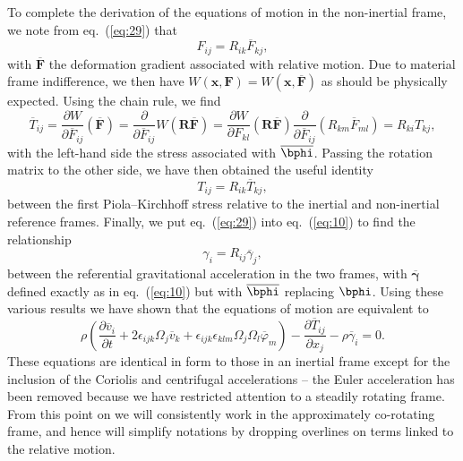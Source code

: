 To complete the derivation of the equations of motion in the non-inertial frame, we note from eq.~(\ref{eq:29}) that
\begin{equation}
F_{ij}=R_{ik}\overline{F}_{kj},
\label{eq:36}
\end{equation}
with $\overline{\mathbf{F}}$ the deformation gradient associated with relative motion. Due to material frame 
indifference, we then have $W(\mathbf{x},\mathbf{F})=W(\mathbf{x},\overline{\mathbf{F}})$ as should be physically 
expected. Using the chain rule, we find
\begin{equation}
\overline{T}_{ij}=\frac{\partial W}{\partial\overline{F}_{ij}}(\overline{\mathbf{F}})=\frac{\partial}{\partial
\overline{F}_{ij}}W(\mathbf{R}\overline{\mathbf{F}})=\frac{\partial W}{\partial F_{kl}}(\mathbf{R}\overline{\mathbf{F}})
\frac{\partial}{\partial\overline{F}_{ij}}(R_{km}\overline{F}_{ml})=R_{ki}T_{kj},
\label{eq:37}
\end{equation}
with the left-hand side the stress associated with $\overline{\bphi}$. Passing the rotation matrix to the 
other side, we have then obtained the useful identity
\begin{equation}
T_{ij}=R_{ik}\overline{T}_{kj},
\label{eq:38}
\end{equation}
between the first Piola--Kirchhoff stress relative to the inertial and non-inertial reference frames. Finally, we put 
eq.~(\ref{eq:29}) into eq.~(\ref{eq:10}) to find the relationship
\begin{equation}
\gamma_{i}=R_{ij}\overline{\gamma}_{j},
\label{eq:39}
\end{equation}
between the referential gravitational acceleration in the two frames, with $\overline{\bm{\gamma}}$ defined 
exactly as in eq.~(\ref{eq:10}) but with $\overline{\bphi}$ replacing $\bphi$. Using these various 
results we have shown that the equations of motion are equivalent to
\begin{equation}
\rho\left(\frac{\partial\overline{v}_{i}}{\partial t}+2\epsilon_{ijk}\Omega_{j}\overline{v}_{k}+\epsilon_{ijk}
\epsilon_{klm}\Omega_{j}\Omega_{l}\overline{\varphi}_{m}\right)-\frac{\partial\overline{T}_{ij}}{\partial x_{j}}-\rho\overline{\gamma}_{i}=0.
\label{eq:40}
\end{equation}
These equations are identical in form to those in an inertial frame except for the inclusion of the Coriolis and 
centrifugal accelerations -- the Euler acceleration has been removed because we have restricted attention to a 
steadily rotating frame. From this point on we will consistently work in the approximately co-rotating frame, 
and hence will simplify notations by dropping overlines on terms linked to the relative motion. 

